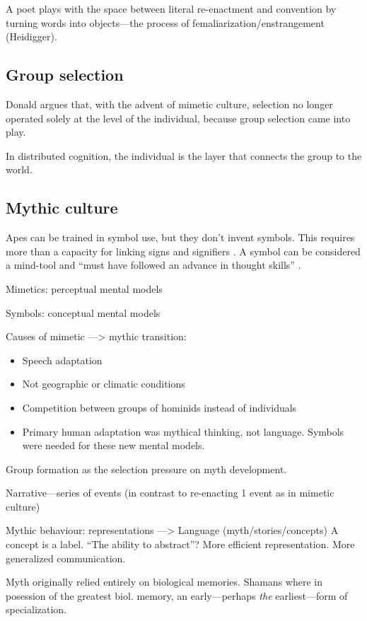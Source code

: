 \documentclass{article}
\begin{document}
A poet plays with the space between literal re-enactment and convention by turning words into objects---the process of femaliarization/enstrangement (Heidigger).

\subsection{Group selection}

Donald argues that, with the advent of mimetic culture, selection no longer operated solely at the level of the individual, because group selection came into play.

In distributed cognition, the individual is the layer that connects the group to the world.

\subsection{Mythic culture}

Apes can be trained in symbol use, but they don't invent symbols. This requires more than a capacity for linking signs and signifiers \citep[p.~217-220]{donald1991}. A symbol can be considered a mind-tool \citep{gregory1981} and ``must have followed an advance in thought skills'' \citep[p.219]{donald1991}.

Mimetics: perceptual mental models

Symbols: conceptual mental models

Causes of mimetic ---> mythic transition:
\begin{itemize}
  \item Speech adaptation
  \item Not geographic or climatic conditions
  \item Competition between groups of hominids instead of individuals %
  \item Primary human adaptation was mythical thinking, not language. Symbols were needed for these new mental models.
\end{itemize}

Group formation as the selection pressure on myth development.

Narrative---series of events (in contrast to re-enacting 1 event as in mimetic culture)

Mythic behaviour: representations ---> Language (myth/stories/concepts) A concept is a label.
“The ability to abstract”?
More efficient representation.
More generalized communication.

Myth originally relied entirely on biological memories. Shamans where in posession of the greatest biol. memory, an early---perhaps \emph{the} earliest---form of specialization.
\end{document}
